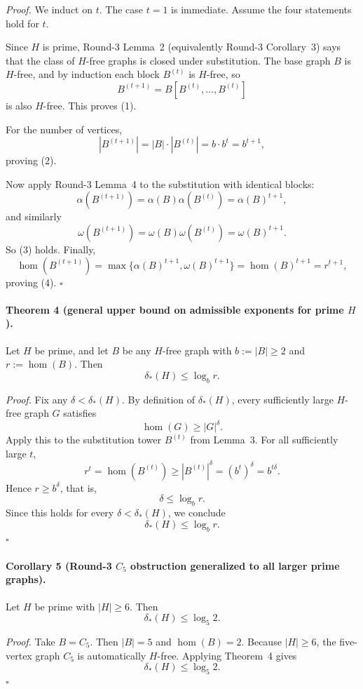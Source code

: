 \emph{Proof.}
We induct on $t$.
The case $t=1$ is immediate.
Assume the four statements hold for $t$.

Since $H$ is prime, Round-3 Lemma~2 (equivalently Round-3 Corollary~3) says that the class of $H$-free graphs is closed under substitution.
The base graph $B$ is $H$-free, and by induction each block $B^{(t)}$ is $H$-free, so
\[
B^{(t+1)}=B[B^{(t)},\dots,B^{(t)}]
\]
is also $H$-free.
This proves (1).

For the number of vertices,
\[
|B^{(t+1)}|=|B|\cdot |B^{(t)}|=b\cdot b^t=b^{t+1},
\]
proving (2).

Now apply Round-3 Lemma~4 to the substitution with identical blocks:
\[
\alpha(B^{(t+1)})=\alpha(B)\alpha(B^{(t)})=\alpha(B)^{t+1},
\]
and similarly
\[
\omega(B^{(t+1)})=\omega(B)\omega(B^{(t)})=\omega(B)^{t+1}.
\]
So (3) holds.
Finally,
\[
\hom(B^{(t+1)})=\max\{\alpha(B)^{t+1},\omega(B)^{t+1}\}=\hom(B)^{t+1}=r^{t+1},
\]
proving (4).
\hfill$\square$

\medskip
\paragraph{Theorem 4 (general upper bound on admissible exponents for prime $H$).}
Let $H$ be prime, and let $B$ be any $H$-free graph with $b:=|B|\ge 2$ and $r:=\hom(B)$.
Then
\[
\delta_*(H)\le \log_b r.
\]

\emph{Proof.}
Fix any $\delta<\delta_*(H)$.
By definition of $\delta_*(H)$, every sufficiently large $H$-free graph $G$ satisfies
\[
\hom(G)\ge |G|^{\delta}.
\]
Apply this to the substitution tower $B^{(t)}$ from Lemma~3.
For all sufficiently large $t$,
\[
r^t=\hom(B^{(t)})\ge |B^{(t)}|^{\delta}=(b^t)^{\delta}=b^{t\delta}.
\]
Hence $r\ge b^{\delta}$, that is,
\[
\delta\le \log_b r.
\]
Since this holds for every $\delta<\delta_*(H)$, we conclude
\[
\delta_*(H)\le \log_b r.
\]
\hfill$\square$

\medskip
\paragraph{Corollary 5 (Round-3 $C_5$ obstruction generalized to all larger prime graphs).}
Let $H$ be prime with $|H|\ge 6$.
Then
\[
\delta_*(H)\le \log_5 2.
\]

\emph{Proof.}
Take $B=C_5$.
Then $|B|=5$ and $\hom(B)=2$.
Because $|H|\ge 6$, the five-vertex graph $C_5$ is automatically $H$-free.
Applying Theorem~4 gives
\[
\delta_*(H)\le \log_5 2.
\]
\hfill$\square$

\medskip
